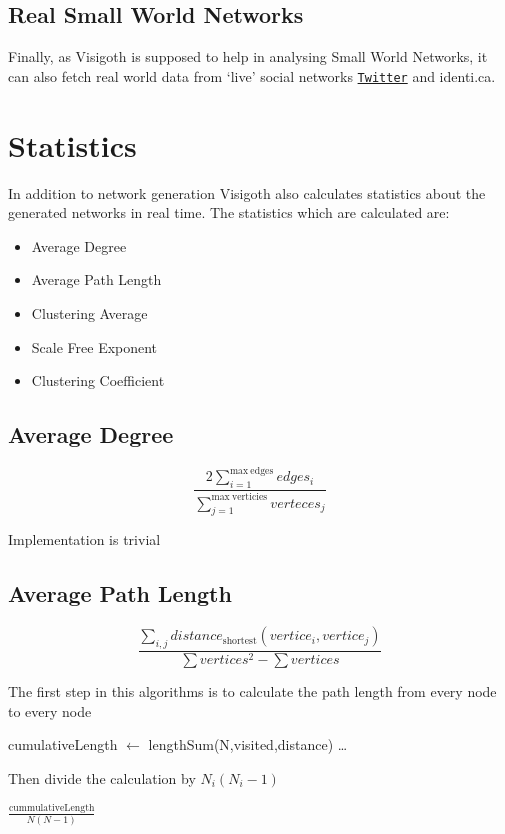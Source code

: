 \documentclass[a4paper,11pt,titlepage]{article}
\let\stdhref\href
\renewcommand{\href}[2]{\stdhref{#1}{\texttt{#2}}}
\let\stdsection\section         %
\renewcommand{\section}{\newpage\stdsection}
\newcommand{\Twitter}{\href{http://twitter.com}{Twitter} }
\begin{document}
\subsection{Real Small World Networks}
Finally, as Visigoth is supposed to help in analysing Small World
Networks, it can also fetch real world data from `live' social
networks \Twitter and identi.ca.

\section{Statistics}


In addition to network generation Visigoth also calculates statistics about the
generated networks in real time. The statistics which are calculated are:


\begin{itemize}
	\item Average Degree
	\item Average Path Length
	\item Clustering Average
	\item Scale Free Exponent
	\item Clustering Coefficient
\end{itemize}

\subsection{Average Degree}
\[
\frac{2\sum_{i=1}^{\mathrm{max\ edges}} edges_i}{\sum_{j=1}^{\mathrm{max\
verticies}} verteces_j}
\]

Implementation is trivial

\subsection{Average Path Length}
\[
\frac{\sum_{i,j}distance_\mathrm{shortest}(vertice_i,vertice_j)}{\sum
vertices^2 - \sum vertices}
\]

The first step in this algorithms is to calculate the path length from every
node to every node

\begin{algorithmic}
	\STATE cumulativeLength $\gets$ lengthSum(N,visited,distance)
	\STATE \dots
\ENDFOR
\end{algorithmic}
Then divide the calculation by $N_i(N_i-1)$
\begin{algorithmic}
	\RETURN  $\frac{\mathrm{cummulativeLength}}{N(N-1)}$
\end{algorithmic}
\end{document}
